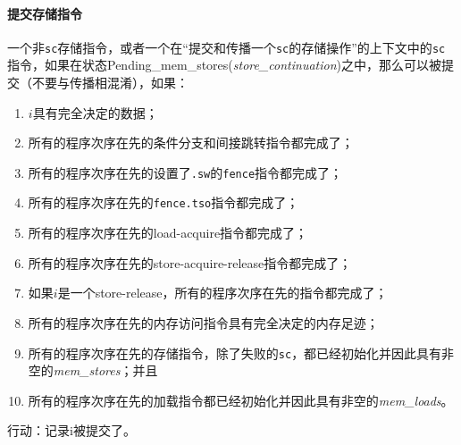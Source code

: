 \paragraph{提交存储指令}\label{omm:commit_stores}
一个非{\tt sc}存储指令，或者一个在“提交和传播一个{\tt sc}的存储操作”的上下文中的{\tt sc}指令，如果在状态{\sc Pending\_mem\_stores}({\it store\_continuation})之中，那么可以被提交（不要与传播相混淆），如果：
\begin{enumerate}
\item $i$具有完全决定的数据； %
\item 所有的程序次序在先的条件分支和间接跳转指令都完成了； %
\item 所有的程序次序在先的设置了{\tt .sw}的{\tt fence}指令都完成了； %
\item 所有的程序次序在先的{\tt fence.tso}指令都完成了； %
\item 所有的程序次序在先的load-acquire指令都完成了； %
\item 所有的程序次序在先的store-acquire-release指令都完成了； %
\item 如果$i$是一个store-release，所有的程序次序在先的指令都完成了； %
\item\label{omm:commit_store:prev_addrs} 所有的程序次序在先的内存访问指令具有完全决定的内存足迹； %
\item\label{omm:commit_store:prev_stores} 所有的程序次序在先的存储指令，除了失败的{\tt sc}，都已经初始化并因此具有非空的{\it mem\_stores}；并且  %
\item\label{omm:commit_store:prev_loads} 所有的程序次序在先的加载指令都已经初始化并因此具有非空的{\it mem\_loads}。 %
\end{enumerate}
行动：记录i被提交了。

